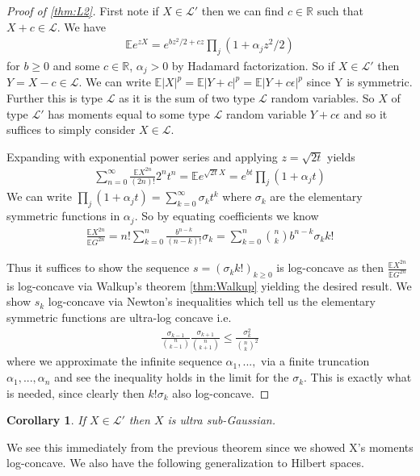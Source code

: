\documentclass[10pt]{article}
\newcommand{\E}{\mathbb{E}}
\newcommand{\1}{\textbf{1}}
\newcommand{\R}{\mathbb{R}}
\newtheorem{corollary}[theorem]{Corollary}
\theoremstyle{remark}
\theoremstyle{definition}
\begin{document}
\begin{proof}[Proof of \ref{thm:L2}]
	First note if $X \in \mathcal{L}'$ then we can find $c \in \R$ such that $X+c \in \mathcal{L}$. We have
	\begin{align*}
		\E e^{zX} = e^{bz^2/2+cz}\prod_j(1+\alpha_jz^2/2)
	\end{align*}
	for $b \geq 0$ and some $c \in \R$, $\alpha_j > 0$ by Hadamard factorization. So if $X \in \mathcal{L}'$ then $Y = X-c \in \mathcal{L}$. We can write $\E|X|^p = \E|Y+c|^p = \E|Y+c\epsilon|^p$ since Y is symmetric. Further this is type $\mathcal{L}$ as it is the sum of two type $\mathcal{L}$ random variables. So $X$ of type $\mathcal{L}'$ has moments equal to some type $\mathcal{L}$ random variable $Y+c\epsilon$ and so it suffices to simply consider $X \in \mathcal{L}$.

	Expanding with exponential power series and applying $z = \sqrt{2t}$ yields
	\begin{align*}
		\sum_{n=0}^{\infty}\frac{\E X^{2n}}{(2n)!} 2^nt^n = \E e^{\sqrt{2t}X} = e^{bt}\prod_j(1+\alpha_j t)
	\end{align*}
	We can write $\prod_j(1+\alpha_j t) = \sum_{k=0}^{\infty}\sigma_k t^k$ where $\sigma_k$ are the elementary symmetric functions in $\alpha_j$. So by equating coefficients we know 
	\begin{align*}
		\frac{\E X^{2n}}{\E G^{2n}} = n!\sum_{k=0}^n \frac{b^{n-k}}{(n-k)!}\sigma_k = \sum_{k=0}^n {n \choose k}b^{n-k}\sigma_k k!
	\end{align*}

	Thus it suffices to show the sequence $s = (\sigma_k k!)_{k \geq 0}$ is log-concave as then $\frac{\E X^{2n}}{\E G^{2n}}$ is log-concave via Walkup's theorem \ref{thm:Walkup} yielding the desired result. We show $s_k$ log-concave via Newton's inequalities which tell us the elementary symmetric functions are ultra-log concave i.e.
	\begin{align*}
		\frac{\sigma_{k-1}}{{n \choose k-1}}\frac{\sigma_{k+1}}{{n \choose k+1}} \leq \frac{\sigma_{k}^2}{{n \choose k}^2}
	\end{align*} where we approximate the infinite sequence $\alpha_1,...,$ via a finite truncation $\alpha_1,...,\alpha_n$ and see the inequality holds in the limit for the $\sigma_k$. This is exactly what is needed, since clearly then $k!\sigma_k$ also log-concave. 
\end{proof}

\begin{corollary}
	If $X \in \mathcal{L}'$ then $X$ is ultra sub-Gaussian. 
\end{corollary} We see this immediately from the previous theorem since we showed X's moments log-concave. We also have the following generalization to Hilbert spaces.
\end{document}
